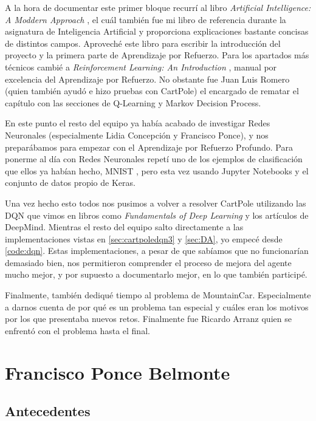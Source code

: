 A la hora de documentar este primer bloque recurrí al libro \textit{Artificial Intelligence: A Moddern Approach} \citep{Russell:2009:AIM:1671238}, el cuál también fue mi libro de referencia durante la asignatura de Inteligencia Artificial y proporciona explicaciones bastante concisas de distintos campos. Aproveché este libro para escribir la introducción del proyecto y la primera parte de Aprendizaje por Refuerzo. Para los apartados más técnicos cambié a \textit{Reinforcement Learning: An Introduction} \citep{Sutton:2018:RLI:3312046}, manual por excelencia del Aprendizaje por Refuerzo. No obstante fue Juan Luis Romero (quien también ayudó e hizo pruebas con CartPole) el encargado de rematar el capítulo con las secciones de Q-Learning y Markov Decision Process.

En este punto el resto del equipo ya había acabado de investigar Redes Neuronales (especialmente Lidia Concepción y Francisco Ponce), y nos preparábamos para empezar con el Aprendizaje por Refuerzo Profundo. Para ponerme al día con Redes Neuronales repetí uno de los ejemplos de clasificación que ellos ya habían hecho, MNIST \citep{MNISTKeras}, pero esta vez usando Jupyter Notebooks y el conjunto de datos propio de Keras.

Una vez hecho esto todos nos pusimos a volver a resolver CartPole utilizando las DQN que vimos en libros como \textit{Fundamentals of Deep Learning} \citep{Buduma:dnn} y los artículos de DeepMind. Mientras el resto del equipo salto directamente a las implementaciones vistas en \ref{sec:cartpoledqn3} y \ref{sec:DA}, yo empecé desde \ref{code:dqn}. Estas implementaciones, a pesar de que sabíamos que no funcionarían demasiado bien, nos permitieron comprender el proceso de mejora del agente mucho mejor, y por supuesto a documentarlo mejor, en lo que también participé.

Finalmente, también dediqué tiempo al problema de MountainCar. Especialmente a darnos cuenta de por qué es un problema tan especial y cuáles eran los motivos por los que presentaba nuevos retos. Finalmente fue Ricardo Arranz quien se enfrentó con el problema hasta el final.

\section{Francisco Ponce Belmonte}


\subsection{Antecedentes}

